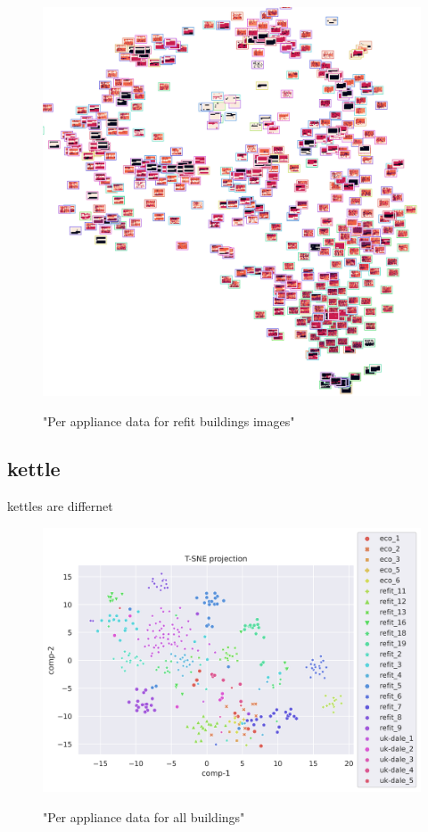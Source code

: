 \begin{figure}[H]
	\centering
	\caption{"Per appliance data for refit buildings images"}
	\includegraphics[width=.9\textwidth]{Figures/TSNE/TSNE_per_appliance/all/img_scatter_allfridge_freeezer_fridge freezer.png}
	\label{fig:tsne_pa_img_scatter_all_fridge}
\end{figure}


\subsection{kettle}
kettles are differnet

\begin{figure}[H]
	\centering
	\caption{"Per appliance data for all buildings"}
	\includegraphics[width=1.2\textwidth]{Figures/TSNE/TSNE_per_appliance/all/scatter_all_kettle.png}
	\label{fig:tsne_pa_scatter_all_kettle}
\end{figure}

